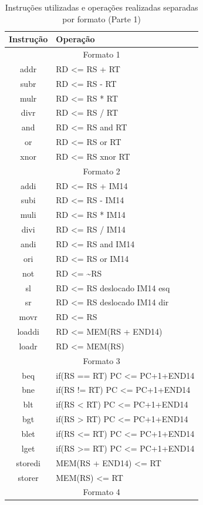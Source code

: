 \documentclass[
	12pt,				%
	oneside,
	a4paper,			%
	english,			%
	french,				%
	spanish,			%
	brazil,				%
	]{abntex2}
\begin{document}
\setlength{\tabcolsep}{10pt}
\begin{table}[H]
\centering
\caption{Instruções utilizadas e operações realizadas separadas por formato (Parte 1)}
\label{opcode1}
\begin{tabular}{|c|>{\raggedright\arraybackslash}p{7cm}|}
\hline
Instrução & Operação\\
\hline
\multicolumn{2}{|c|}{Formato 1} \\
\hline
addr & RD <= RS + RT \\
subr & RD <= RS - RT \\
mulr & RD <= RS * RT \\
divr & RD <= RS / RT \\
and & RD <= RS and RT \\
or & RD <= RS or RT \\
xnor & RD <= RS xnor RT \\
\hline
\multicolumn{2}{|c|}{Formato 2} \\
\hline
addi & RD <= RS + IM14 \\
subi & RD <= RS - IM14 \\
muli & RD <= RS * IM14 \\
divi & RD <= RS / IM14 \\
andi & RD <= RS and IM14 \\
ori & RD <= RS or IM14 \\
not & RD <= \textasciitilde RS \\
sl & RD <= RS deslocado IM14 esq \\
sr & RD <= RS deslocado IM14 dir \\
movr & RD <= RS \\
loaddi & RD <= MEM(RS + END14) \\
loadr & RD <= MEM(RS) \\
\hline
\multicolumn{2}{|c|}{Formato 3} \\
\hline
beq & if(RS == RT) PC <= PC+1+END14 \\
bne & if(RS != RT) PC <= PC+1+END14 \\
blt & if(RS < RT) PC <= PC+1+END14 \\
bgt & if(RS > RT) PC <= PC+1+END14 \\
blet & if(RS <= RT) PC <= PC+1+END14 \\
lget & if(RS >= RT) PC <= PC+1+END14 \\
storedi & MEM(RS + END14) <= RT \\
storer & MEM(RS) <= RT \\
\hline
\multicolumn{2}{|c|}{Formato 4} \\

\end{tabular}
\end{table}
\end{document}
